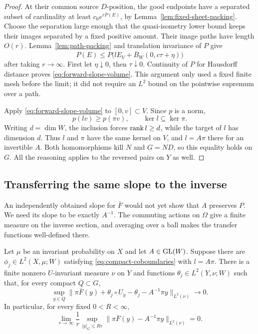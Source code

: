 \begin{proof}
At their common source $D$-position, the good endpoints have a
separated subset of cardinality at least
$c_0 e^{rP(E)}$, by Lemma~\ref{lem:fixed-sheet-packing}.
Choose the separation large enough that the quasi-isometry lower
bound keeps their images separated by a fixed positive amount.
Their image paths have length $O(r)$.  Lemma~\ref{lem:path-packing}
and translation invariance of $P$ give
\[
 P(E)\le P\bigl(lE_V+\overline B_W(0,c\tau+\eta)\bigr)
\]
after taking $r\to\infty$.  First let $\eta\downarrow0$, then
$\tau\downarrow0$.  Continuity of $P$ for Hausdorff distance proves
\eqref{eq:forward-slope-volume}.  This argument only used a fixed
finite mesh before the limit; it did not require an $L^2$ bound on
the pointwise supremum over a path.

Apply \eqref{eq:forward-slope-volume} to $[0,v]\subset V$.
Since $p$ is a norm,
\[
 p(lv)\ge p(\pi v),\qquad \ker l\subseteq\ker\pi.
\]
Writing $d=\dim W$, the inclusion forces $\operatorname{rank} l\ge d$, while
the target of $l$ has dimension $d$.  Thus $l$ and $\pi$ have the
same kernel on $V$, and $l=A\pi$ there for an invertible $A$.
Both homomorphisms kill $N$ and $G=ND$, so this equality holds on $G$.
All the reasoning applies to the reversed pairs on $Y$ as well.
\end{proof}

\subsection{Transferring the same slope to the inverse}

An independently obtained slope for $\bar F$ would not yet show
that $A$ preserves $P$.  We need its slope to be exactly $A^{-1}$.
The commuting actions on $\Omega$ give a finite measure on the
inverse section, and averaging over a ball makes the transfer functions
well-defined there.

\begin{lemma}\label{lem:inverse-coupling}
Let $\mu$ be an invariant probability on $X$ and let $A\in\operatorname{GL}(W)$.
Suppose there are $\phi_j\in L^2(X,\mu;W)$ satisfying
\eqref{eq:compact-coboundaries} with $l=A\pi$.
There is a finite nonzero $U$-invariant measure $\nu$ on $Y$ and
functions $\theta_j\in L^2(Y,\nu;W)$ such that, for every compact
$Q\subset G$,
\begin{equation}\label{eq:inverse-coboundaries}
 \sup_{y\in Q}
 \bigl\|\pi\bar F(y)+\theta_j\circ U_y-\theta_j-A^{-1}\pi y
 \bigr\|_{L^2(\nu)}\longrightarrow0.
\end{equation}
In particular, for every fixed $0<R<\infty$,
\begin{equation}\label{eq:inverse-stationary-sublinear}
 \lim_{r\to\infty}\frac1r\sup_{|y|_G\le Rr}
 \|\pi\bar F(y)-A^{-1}\pi y\|_{L^2(\nu)}=0.
\end{equation}
\end{lemma}

